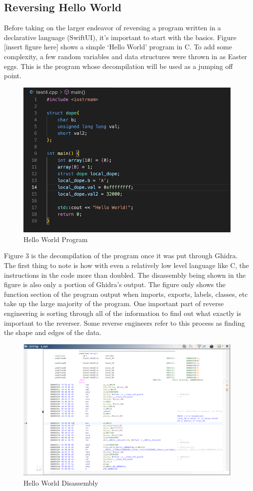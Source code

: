 \subsection{Reversing Hello World}
Before taking on the larger endeavor of reversing a program written in a declarative language (SwiftUI), it’s important to start with the basics. 
Figure [insert figure here] shows a simple ‘Hello World’ program in C. 
To add some complexity, a few random variables and data structures were thrown in as Easter eggs. 
This is the program whose decompilation will be used as a jumping off point.
\begin{figure}[h]
	\caption{Hello World Program}
	\includegraphics[scale=.75]{HelloWorldSource.png}
\end{figure}
Figure 3 is the decompilation of the program once it was put through Ghidra. 
The first thing to note is how with even a relatively low level language like C, the instructions in the code more than doubled. 
The disassembly being shown in the figure is also only a portion of Ghidra’s output. 
The figure only shows the function section of the program output when imports, exports, labels, classes, etc take up the large majority of the program. 
One important part of reverse engineering is sorting through all of the information to find out what exactly is important to the reverser. 
Some reverse engineers refer to this process as finding the shape and edges of the data. 
\begin{figure}[h]
	\caption{Hello World Disassembly}
	\includegraphics{HelloWorldGhidra.png}
\end{figure}
